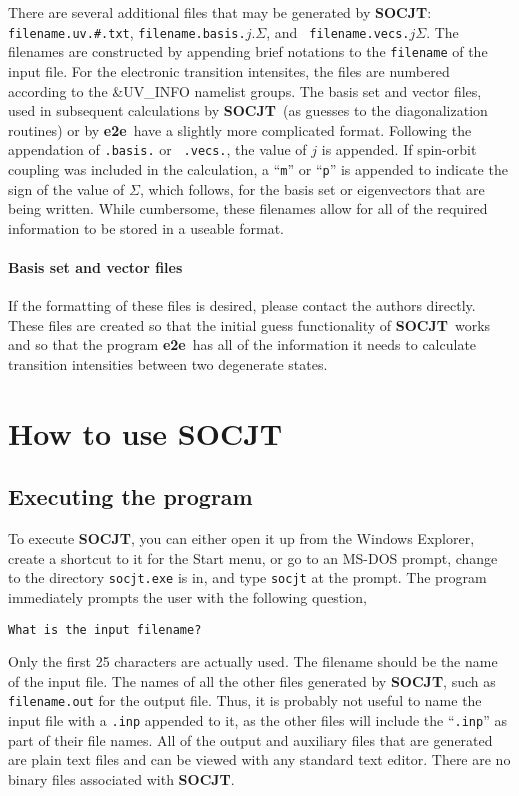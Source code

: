 \documentclass{article}
\newcommand{\socjt}{{\bf SOCJT}}
\newcommand{\etoe}{{\bf e2e}}
\begin{document}
There are several additional files that may be generated by \socjt :
{\tt filename.uv.\#.txt}, {\tt filename.basis.}$j.\Sigma $, and {\tt
  filename.vecs.}$j\Sigma $. The filenames are constructed by
appending brief notations to the {\tt filename} of the input file. For
the electronic transition intensites, the files are numbered according
to the \&UV\_INFO namelist groups. The basis set and vector files,
used in subsequent calculations by \socjt\ (as guesses to the
diagonalization routines) or by \etoe\ have a slightly more
complicated format. Following the appendation of {\tt .basis.} or {\tt
  .vecs.}, the value of $j$ is appended. If spin-orbit coupling was
included in the calculation, a ``{\tt m}'' or ``{\tt p}'' is appended
to indicate the sign of the value of $\Sigma $, which follows, for the
basis set or eigenvectors that are being written. While cumbersome,
these filenames allow for all of the required information to be stored
in a useable format.


\paragraph{Basis set and vector files}

If the formatting of these files is desired, please contact the
authors directly. These files are created so that the initial guess
functionality of \socjt\ works and so that the program \etoe\ has all
of the information it needs to calculate transition intensities
between two degenerate states.

\section{How to use SOCJT} \label{section:howto}

\subsection{Executing the program}
To execute \socjt , you can either open it up from the Windows
Explorer, create a shortcut to it for the Start menu, or go to an
MS-DOS prompt, change to the directory {\tt socjt.exe} is in, and type
{\tt socjt} at the prompt. The program immediately prompts the user
with the following question,
\begin{verbatim}
What is the input filename?
\end{verbatim}
Only the first 25 characters are actually used. The
filename should be the name of the input file. The names of all the
other files generated by \socjt , such as {\tt filename.out} for the
output file. Thus, it is probably not useful to name the input file
with a {\tt .inp} appended to it, as the other files will include the
``{\tt .inp}'' as part of their file names. All of the output and
auxiliary files that are generated are plain text files and can be
viewed with any standard text editor. There are no binary files
associated with \socjt .
\end{document}
